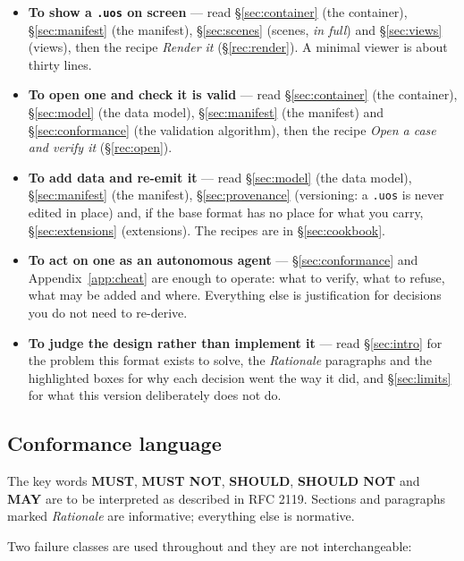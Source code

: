 \documentclass[11pt,a4paper]{article}
\newcommand{\MUST}{\textcolor{uosred}{\textbf{MUST}}}
\newcommand{\MUSTNOT}{\textcolor{uosred}{\textbf{MUST NOT}}}
\newcommand{\SHOULD}{\textcolor{uosamber}{\textbf{SHOULD}}}
\newcommand{\SHOULDNOT}{\textcolor{uosamber}{\textbf{SHOULD NOT}}}
\newcommand{\MAY}{\textcolor{uosgreen}{\textbf{MAY}}}
\newcommand{\code}[1]{\texttt{\small #1}}
\begin{document}
\begin{itemize}[leftmargin=1.2em]
  \item \textbf{To show a \code{.uos} on screen} --- read \S\ref{sec:container} (the
  container), \S\ref{sec:manifest} (the manifest), \S\ref{sec:scenes} (scenes,
  \emph{in full}) and \S\ref{sec:views} (views), then the recipe \emph{Render it}
  (\S\ref{rec:render}). A minimal viewer is about thirty lines.

  \item \textbf{To open one and check it is valid} --- read \S\ref{sec:container} (the
  container), \S\ref{sec:model} (the data model), \S\ref{sec:manifest} (the manifest) and
  \S\ref{sec:conformance} (the validation algorithm), then the recipe \emph{Open a case
  and verify it} (\S\ref{rec:open}).

  \item \textbf{To add data and re-emit it} --- read \S\ref{sec:model} (the data model),
  \S\ref{sec:manifest} (the manifest), \S\ref{sec:provenance} (versioning: a \code{.uos}
  is never edited in place) and, if the base format has no place for what you carry,
  \S\ref{sec:extensions} (extensions). The recipes are in \S\ref{sec:cookbook}.

  \item \textbf{To act on one as an autonomous agent} --- \S\ref{sec:conformance} and
  Appendix~\ref{app:cheat} are enough to operate: what to verify, what to refuse, what may
  be added and where. Everything else is justification for decisions you do not need to
  re-derive.

  \item \textbf{To judge the design rather than implement it} --- read \S\ref{sec:intro}
  for the problem this format exists to solve, the \emph{Rationale} paragraphs and the
  highlighted boxes for why each decision went the way it did, and \S\ref{sec:limits} for
  what this version deliberately does not do.
\end{itemize}

\subsection{Conformance language}

The key words \MUST, \MUSTNOT, \SHOULD, \SHOULDNOT{} and \MAY{} are to be interpreted as
described in RFC 2119. Sections and paragraphs marked \emph{Rationale} are informative;
everything else is normative.

Two failure classes are used throughout and they are not interchangeable:
\end{document}

